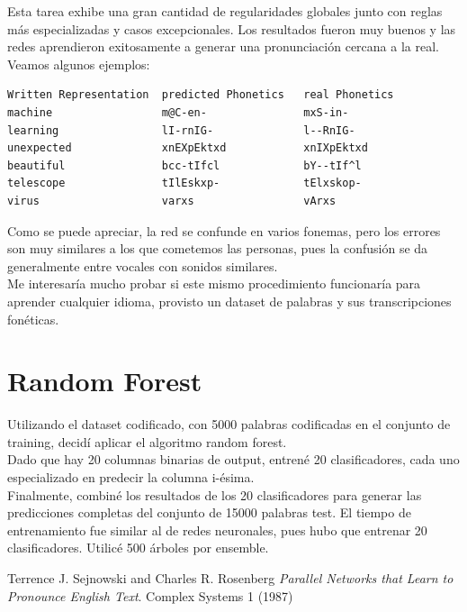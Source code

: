 \documentclass[paper=a4, fontsize=11pt]{scrartcl} %
\numberwithin{equation}{section} %
\numberwithin{figure}{section} %
\numberwithin{table}{section} %
\begin{document}
Esta tarea exhibe una gran cantidad de regularidades globales junto con reglas más especializadas y casos excepcionales. Los resultados fueron muy buenos y las redes aprendieron exitosamente a generar una pronunciación cercana a la real. Veamos algunos ejemplos:

\begin{center}
\begin{BVerbatim}
Written Representation  predicted Phonetics   real Phonetics  
machine                 m@C-en-               mxS-in-  
learning                lI-rnIG-              l--RnIG- 
unexpected              xnEXpEktxd            xnIXpEktxd  
beautiful               bcc-tIfcl             bY--tIf^l 
telescope               tIlEskxp-             tElxskop- 
virus                   varxs                 vArxs

\end{BVerbatim}
\end{center}


Como se puede apreciar, la red se confunde en varios fonemas, pero los errores son muy similares a los que cometemos las personas, pues la confusión se da generalmente entre vocales con sonidos similares. \\

Me interesaría mucho probar si este mismo procedimiento funcionaría para aprender cualquier idioma, provisto un dataset de palabras y sus transcripciones fonéticas. 

\section{Random Forest}

Utilizando el dataset codificado, con 5000 palabras codificadas en el conjunto de training, decidí aplicar el algoritmo random forest.\\
Dado que hay 20 columnas binarias de output, entrené 20 clasificadores, cada uno especializado en predecir la columna i-ésima. \\
Finalmente, combiné los resultados de los 20 clasificadores para generar las predicciones completas del conjunto de 15000 palabras test. El tiempo de entrenamiento fue similar al de redes neuronales, pues hubo que entrenar 20 clasificadores. Utilicé 500 árboles por ensemble.\\








\begin{thebibliography}{9}
Terrence J. Sejnowski and Charles R. Rosenberg
\textit{Parallel Networks that Learn to Pronounce English Text}. 
Complex Systems 1 (1987)
 

\end{thebibliography}
\end{document}
